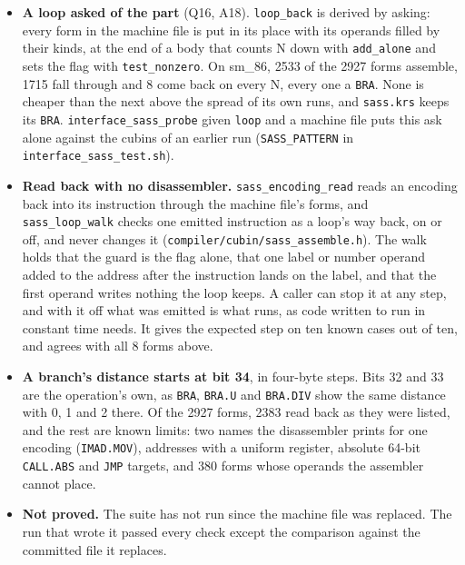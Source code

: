 \begin{enumerate}
\begin{itemize}
\item \textbf{A loop asked of the part} (Q16, A18). \texttt{loop\_\allowbreak{}back} is derived by asking: every form in the machine file is put in its place with its operands filled by their kinds, at the end of a body that counts N down with \texttt{add\_\allowbreak{}alone} and sets the flag with \texttt{test\_\allowbreak{}nonzero}. On sm\_\allowbreak{}86, 2533 of the 2927 forms assemble, 1715 fall through and 8 come back on every N, every one a \texttt{BRA}. None is cheaper than the next above the spread of its own runs, and \texttt{sass.\allowbreak{}krs} keeps its \texttt{BRA}. \texttt{interface\_\allowbreak{}sass\_\allowbreak{}probe} given \texttt{loop} and a machine file puts this ask alone against the cubins of an earlier run (\texttt{SASS\_\allowbreak{}PATTERN} in \texttt{interface\_\allowbreak{}sass\_\allowbreak{}test.\allowbreak{}sh}).
\item \textbf{Read back with no disassembler.} \texttt{sass\_\allowbreak{}encoding\_\allowbreak{}read} reads an encoding back into its instruction through the machine file's forms, and \texttt{sass\_\allowbreak{}loop\_\allowbreak{}walk} checks one emitted instruction as a loop's way back, on or off, and never changes it (\texttt{compiler/\allowbreak{}cubin/\allowbreak{}sass\_\allowbreak{}assemble.\allowbreak{}h}). The walk holds that the guard is the flag alone, that one label or number operand added to the address after the instruction lands on the label, and that the first operand writes nothing the loop keeps. A caller can stop it at any step, and with it off what was emitted is what runs, as code written to run in constant time needs. It gives the expected step on ten known cases out of ten, and agrees with all 8 forms above.
\item \textbf{A branch's distance starts at bit 34}, in four-byte steps. Bits 32 and 33 are the operation's own, as \texttt{BRA}, \texttt{BRA.\allowbreak{}U} and \texttt{BRA.\allowbreak{}DIV} show the same distance with 0, 1 and 2 there. Of the 2927 forms, 2383 read back as they were listed, and the rest are known limits: two names the disassembler prints for one encoding (\texttt{IMAD.\allowbreak{}MOV}), addresses with a uniform register, absolute 64-bit \texttt{CALL.\allowbreak{}ABS} and \texttt{JMP} targets, and 380 forms whose operands the assembler cannot place.
\item \textbf{Not proved.} The suite has not run since the machine file was replaced. The run that wrote it passed every check except the comparison against the committed file it replaces.
\end{itemize}
\end{enumerate}
